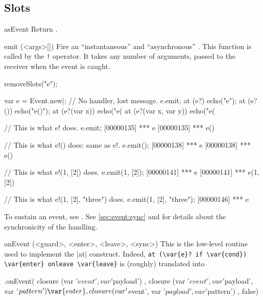 \subsection{Slots}
\begin{urbiscriptapi}
\item[asEvent]
  Return \this.

\item[emit](<args>[])%
  Fire an ``instantaneous'' and ``asynchronous'' . This
  function is called by the \lstinline|!| operator.  It takes any number of
  arguments, passed to the receiver when the event is caught.
\begin{urbicomment}
removeSlots("e");
\end{urbicomment}
\begin{urbiscript}
var e = Event.new|;
// No handler, lost message.
e.emit;
at (e?)               echo("e");
at (e?())             echo("e()");
at (e?(var x))        echo("e(%
at (e?(var x, var y)) echo("e(%

// This is what e! does.
e.emit;
[00000135] *** e
[00000135] *** e()

// This is what e!() does: same as e!.
e.emit();
[00000138] *** e
[00000138] *** e()

// This is what e!(1, [2]) does.
e.emit(1, [2]);
[00000141] *** e
[00000141] *** e(1, [2])

// This is what e!(1, [2], "three") does.
e.emit(1, [2], "three");
[00000146] *** e
\end{urbiscript}

To sustain an event, see .  See \autoref{sec:event:sync}
and  for details about the synchronicity of the handling.


\item[onEvent](<guard>, <enter>, <leave>, <sync>)%
  This is the low-level routine used to implement the \lstindex|at|
  construct.  Indeed,
  \lstinline|at (\var{e}? if \var{cond}) \var{enter} onleave \var{leave}|
  is (roughly) translated into
\begin{urbiunchecked}
  .onEvent(
    closure (var '$event', var '$payload')                 {   },
    closure (var '$event', var '$payload', var '$pattern') { \var{enter} },
    closure (var '$event', var '$payload', var '$pattern') {  },
    false)
\end{urbiunchecked}


\end{urbiscriptapi}
